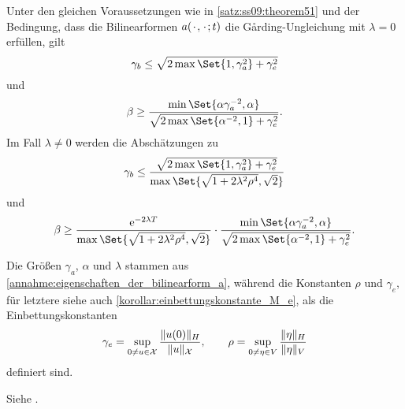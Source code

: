 \begin{Korollar}
\label{korrolar:ss09:theorem51_abschaetzungen}
    Unter den gleichen Voraussetzungen wie in \cref{satz:ss09:theorem51} und der Bedingung, dass die Bilinearformen $a({\mkern2mu\cdot\mkern2mu}, {\mkern2mu\cdot\mkern2mu}; t)$ die G\aa{}rding-Ungleichung mit $\lambda = 0$ erfüllen, gilt
    \begin{equation}
        \label{eq:ss09:theorem51_abschaetzungen:lambda_null:stetig}
        \gamma_{b}  \leq \sqrt{2 \max\Set{1, \gamma_{a}^{2}} + \gamma_{e}^{2}}
    \end{equation}
    und
    \begin{equation}
        \label{eq:ss09:theorem51_abschaetzungen:lambda_null:inf_sup}
        \beta  \geq \frac{\min\Set{\alpha \gamma_{a}^{-2}, \alpha}}{\sqrt{2 \max \Set{\alpha^{-2}, 1} + \gamma_{e}^{2}}}.
    \end{equation}
    Im Fall $\lambda \neq 0$ werden die Abschätzungen zu
    \begin{equation}
        \label{eq:ss09:theorem51_abschaetzungen:lambda_nicht_null:stetig}
        \gamma_{b}  \leq \frac{\sqrt{2\max\Set{1, \gamma_{a}^{2}} + \gamma_{e}^{2}}}{\max\Set{\sqrt{1 + 2 \lambda^{2} \rho^{4}}, \sqrt{2}}}
    \end{equation}
    und
    \begin{equation}
        \label{eq:ss09:theorem51_abschaetzungen:lambda_nicht_null:inf_sup}
        \beta  \geq \frac{ \ee^{-2 \lambda T}}{\max\Set{\sqrt{1 + 2 \lambda^{2} \rho^{4}}, \sqrt{2}}  } \cdot \frac{\min\Set{\alpha \gamma_{a}^{-2}, \alpha}}{\sqrt{2 \max\Set{ \alpha^{-2}, 1} + \gamma_{e}^{2}}}.
    \end{equation}

    Die Größen $\gamma_{a}$, $\alpha$ und $\lambda$ stammen aus \cref{annahme:eigenschaften_der_bilinearform_a},
    während die Konstanten $\rho$ und $\gamma_{e}$, für letztere siehe auch \cref{korollar:einbettungskonstante_M_e}, als die Einbettungskonstanten
    \begin{equation}
        \label{eq:ss09:einbettungskonstanten}
        \gamma_{e} = \sup_{0 \neq u \in \mathcal X} \frac{\lVert u(0)\rVert_{H}}{\lVert u\rVert_{\mathcal X}}, \qquad
        \rho = \sup_{0 \neq \eta \in V} \frac{\lVert\eta\rVert_{H}}{\lVert\eta\rVert_{V}}
    \end{equation}
    definiert sind.

    \begin{Beweis}
        Siehe \cite[Appendix A]{Schwab:2009ec}.
    \end{Beweis}
\end{Korollar}

